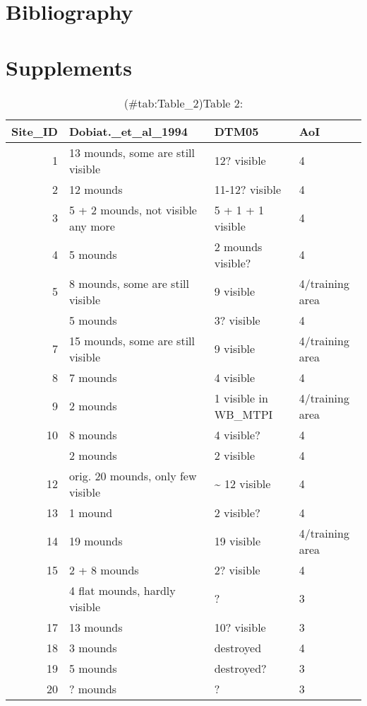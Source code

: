 \documentclass[
]{article}
\begin{document}
\newpage

\hypertarget{bibliography}{%
\section{Bibliography}\label{bibliography}}

\newpage

\hypertarget{supplements}{%
\section{Supplements}\label{supplements}}

\begin{longtable}[t]{rlll}
\caption{(\#tab:Table_2)Table 2: }\\
\toprule
Site\_ID & Dobiat.\_et\_al\_1994 & DTM05 & AoI\\
\midrule
1 & 13 mounds, some are still visible & 12? visible & 4\\
2 & 12 mounds & 11-12? visible & 4\\
3 & 5 + 2 mounds, not visible any more & 5 + 1 + 1 visible & 4\\
4 & 5 mounds & 2 mounds visible? & 4\\
5 & 8 mounds, some are still visible & 9 visible & 4/training area\\
\addlinespace
6 & 5 mounds & 3? visible & 4\\
7 & 15 mounds, some are still visible & 9 visible & 4/training area\\
8 & 7 mounds & 4 visible & 4\\
9 & 2 mounds & 1 visible in WB\_MTPI & 4/training area\\
10 & 8 mounds & 4 visible? & 4\\
\addlinespace
11 & 2 mounds & 2 visible & 4\\
12 & orig. 20 mounds, only few visible & \textasciitilde{} 12 visible & 4\\
13 & 1 mound & 2 visible? & 4\\
14 & 19 mounds & 19 visible & 4/training area\\
15 & 2 + 8 mounds & 2? visible & 4\\
\addlinespace
16 & 4 flat mounds, hardly visible & ? & 3\\
17 & 13 mounds & 10? visible & 3\\
18 & 3 mounds & destroyed & 4\\
19 & 5 mounds & destroyed? & 3\\
20 & ? mounds & ? & 3\\

\end{longtable}
\end{document}
